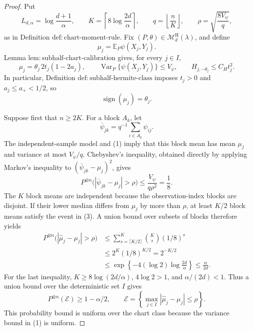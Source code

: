 \documentclass{article}
\begin{document}
\begin{proof}
Put
\[
L_{d,\alpha}=\log\frac{d+1}{\alpha},\qquad
K=\left\lceil 8\log\frac{2d}{\alpha}\right\rceil,
\qquad q=\left\lfloor\frac nK\right\rfloor,
\qquad \rho=\sqrt{\frac{8V_\psi}{q}},
\]
as in Definition \(\mathrm{def:chart\text{-}moment\text{-}rule}\).  Fix
\((P,\theta)\in\mathcal M_d^{\mathrm H}(\lambda)\), and define
\[
\mu_j=\mathbb E_P\psi(X_j,Y_j).
\]
Lemma \(\mathrm{lem:subhalf\text{-}chart\text{-}calibration}\) gives, for every \(j\in I\),
\[
\mu_j=\theta_j\,2t_j(1-2a_j),
\qquad
\operatorname{Var}_P\{\psi(X_j,Y_j)\}\le V_\psi,
\qquad
H_{j,-\theta_j}\le C_Ht_j^2.
\tag{1}
\]
In particular, Definition \(\mathrm{def:subhalf\text{-}hermite\text{-}class}\) imposes \(t_j>0\) and \(a_j\le a_+<1/2\), so
\[
\operatorname{sign}(\mu_j)=\theta_j.
\tag{2}
\]

Suppose first that \(n\ge2K\).  For a block \(A_k\), let
\[
\overline\psi_{jk}=q^{-1}\sum_{i\in A_k}\psi_{ij}.
\]
The independent-sample model and (1) imply that this block mean has mean \(\mu_j\) and variance at most \(V_\psi/q\).  Chebyshev's inequality, obtained directly by applying Markov's inequality to \((\overline\psi_{jk}-\mu_j)^2\), gives
\[
P^{\otimes n}\bigl(|\overline\psi_{jk}-\mu_j|>\rho\bigr)
\le \frac{V_\psi}{q\rho^2}=\frac18.
\tag{3}
\]
The \(K\) block means are independent because the observation-index blocks are disjoint.  If their lower median differs from \(\mu_j\) by more than \(\rho\), at least \(K/2\) block means satisfy the event in (3).  A union bound over subsets of blocks therefore yields
\[
\begin{aligned}
P^{\otimes n}\bigl(|\widehat\mu_j-\mu_j|>\rho\bigr)
&\le \sum_{s=\lceil K/2\rceil}^{K}\binom Ks(1/8)^s\\
&\le 2^K(1/8)^{K/2}
=2^{-K/2}\\
&\le \exp\left\{-4(\log2)\log\frac{2d}{\alpha}\right\}
\le \frac{\alpha}{2d}.
\end{aligned}
\tag{4}
\]
For the last inequality, \(K\ge8\log(2d/\alpha)\), \(4\log2>1\), and \(\alpha/(2d)<1\).  Thus a union bound over the deterministic set \(I\) gives
\[
P^{\otimes n}(\mathcal E)\ge1-\alpha/2,
\qquad
\mathcal E=\left\{\max_{j\in I}|\widehat\mu_j-\mu_j|\le\rho\right\}.
\tag{5}
\]
This probability bound is uniform over the chart class because the variance bound in (1) is uniform.


\end{proof}
\end{document}
